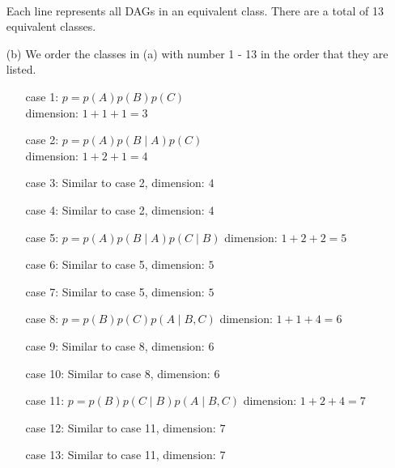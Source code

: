 \documentclass[11pt]{article}
\begin{document}
\begin{answertext}{22cm}{}
\begin{enumerate}
 \\

Each line represents all DAGs in an equivalent class. There are a total of 13 equivalent classes. \\

\item[(b)]
We order the classes in (a) with number 1 - 13 in the order that they are listed. \\
\begin{enumerate}
\item[case 1:]
$p = p(A)p(B)p(C)$ \\
dimension: $1 + 1 + 1 = 3$
\item[case 2:]
$p = p(A)p(B \mid A)p(C)$ \\
dimension: $1 + 2 + 1 = 4$
\item[case 3:]
Similar to case 2, dimension: $4$
\item[case 4:]
Similar to case 2, dimension: $4$
\item[case 5:]
$p = p(A)p(B \mid A)p(C \mid B)$
dimension: $1 + 2 + 2 = 5$
\item[case 6:]
Similar to case 5, dimension: $5$
\item[case 7:]
Similar to case 5, dimension: $5$
\item[case 8:]
$p = p(B)p(C)p(A \mid B,C)$
dimension: $1 + 1 + 4 = 6$
\item[case 9:]
Similar to case 8, dimension: $6$
\item[case 10:]
Similar to case 8, dimension: $6$
\item[case 11:]
$p = p(B)p(C \mid B)p(A \mid B,C)$
dimension: $1 + 2 + 4 = 7$
\item[case 12:]
Similar to case 11, dimension: $7$
\item[case 13:]
Similar to case 11, dimension: $7$
\end{enumerate}
\end{enumerate}
\end{answertext}
\end{document}
